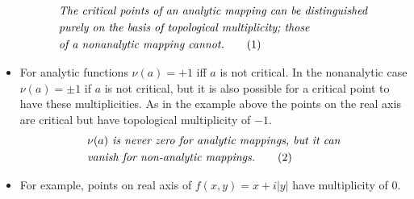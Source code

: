 \documentclass[12pt]{article}
\newcommand\numberthis{\addtocounter{equation}{1}\tag{\theequation}}
\def\tt{\textit}
\begin{document}
\begin{itemize}
    \begin{align*}
        &\tt{The critical points of an analytic mapping can be distinguished}\\
        &\tt{purely on the basis of topological multiplicity; those}\\
        &\tt{of a nonanalytic mapping cannot.} \numberthis \label{e10}
    \end{align*}
    \item For analytic functions $\nu(a)=+1$ iff $a$ is not critical. In the nonanalytic case $\nu(a)=\pm 1$ if $a$ is not critical, but it is also possible for a critical point to have these multiplicities. As in the example above the points on the real axis are critical but have topological multiplicity of $-1$.
    \begin{align*}
        &\tt{$\nu(a)$ is never zero for analytic mappings, but it can}\\
        &\tt{vanish for non-analytic mappings.}\numberthis \label{e11}
    \end{align*}
    \item For example, points on real axis of $f(x,y)=x+i|y|$ have multiplicity of $0$.
\end{itemize}
\end{document}
